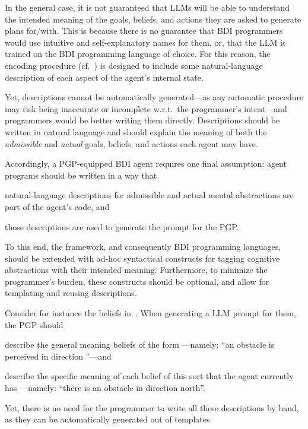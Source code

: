 \documentclass[12pt,a4paper,openright,twoside]{book}
\begin{document}
In the general case, it is not guaranteed that \acp{LLM} will be able to understand the intended meaning of the goals, beliefs, and actions they are asked to generate plans for/with.
%
This is because there is no guarantee that \ac{BDI} programmers would use intuitive and self-explanatory names for them, or, that the \ac{LLM} is trained on the \ac{BDI} programming language of choice.
%
For this reason, the encoding procedure (cf.~) is designed to include some natural-language description of each aspect of the agent's internal state.

Yet, descriptions cannot be automatically generated---as any automatic procedure may risk being inaccurate or incomplete w.r.t.\ the programmer's intent---and programmers would be better writing them directly.
%
Descriptions should be written in natural language and should explain the meaning of both the \emph{admissible} and \emph{actual} goals, beliefs, and actions each agent may have.

Accordingly, a \ac{PGP}-equipped \ac{BDI} agent requires one final assumption: agent programs should be written in a way that
\begin{inlinelist}
    \item natural-language descriptions for admissible and actual mental abstractions are part of the agent's code,
    and
    \item those descriptions are used to generate the prompt for the \ac{PGP}.
\end{inlinelist}
%
To this end, the \agentspeak{} framework, and consequently \ac{BDI} programming languages, should be extended with ad-hoc syntactical constructs for tagging cognitive abstractions with their intended meaning.
%
Furthermore, to minimize the programmer's burden, these constructs should be optional, and allow for templating and reusing descriptions.

Consider for instance the  beliefs in~.
%
When generating a \ac{LLM} prompt for them, the \ac{PGP} should
\begin{inlinelist}
    \item describe the general meaning beliefs of the form 
   ---namely: ``an obstacle is perceived in direction ''---and
    \item describe the specific meaning of each belief of this sort that the agent currently has
   ---namely: ``there is an obstacle in direction north''.
\end{inlinelist}
%
Yet, there is no need for the programmer to write all these descriptions by hand, as they can be automatically generated out of templates.
\end{document}
